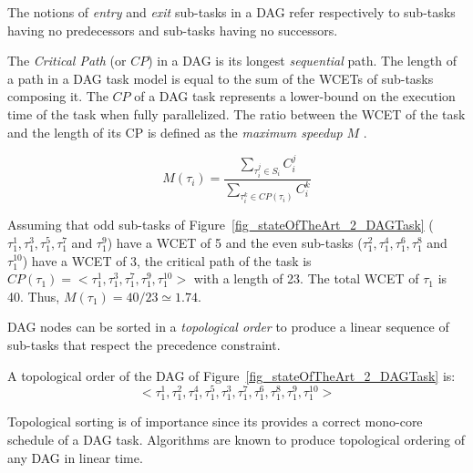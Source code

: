 \documentclass[main.tex]{subfiles}
\begin{document}
The notions of \emph{entry} and \emph{exit} sub-tasks in a DAG refer respectively to sub-tasks having no predecessors and sub-tasks having no successors.


The \emph{Critical Path} (or $CP$) in a DAG is its longest \emph{sequential} path. The length of a path in a DAG task model is equal to the sum of the WCETs of sub-tasks composing it. The $CP$ of a DAG task represents a lower-bound on the execution time of the task when fully parallelized. The ratio between the WCET of the task and the length of its CP is defined as the \emph{maximum speedup} $M$ \cite{Hill2008}.

\begin{displaymath}
    M(\tau_i) = \dfrac{ \underset{\tau_i^j \in S_i}{\sum} C_i^j}{ \underset{ \tau_i^k \in CP(\tau_i) }{\sum} C_i^k}
\end{displaymath}

\begin{example}
    Assuming that odd sub-tasks of Figure~\ref{fig_stateOfTheArt_2_DAGTask} 
    ($\tau_1^1 , \tau_1^3, \tau_1^5, \tau_1^7$ and $\tau_1^9$) have a WCET of 5 and the even sub-tasks 
    ($\tau_1^2 , \tau_1^4, \tau_1^6, \tau_1^8$ and $\tau_1^{10}$) have a WCET of 3, the critical path of the task is $CP(\tau_1) = <\tau_1^1 , \tau_1^3, \tau_1^7, \tau_1^9 , \tau_1^{10}>$ with a length of 23. The total WCET of $\tau_1$ is 40. Thus, $M(\tau_1) = 40/23 \simeq 1.74$. 
\end{example}

DAG nodes can be sorted in a \emph{topological order} to produce a linear sequence of sub-tasks that respect the precedence constraint.

\begin{example}
    A topological order of the DAG of Figure~\ref{fig_stateOfTheArt_2_DAGTask} is:
    $$< \tau_1^1 , \tau_1^2 , \tau_1^4 , \tau_1^5, \tau_1^3 , \tau_1^7 , \tau_1^6 , \tau_1^8 , \tau_1^9 , \tau_1^{10} >$$
\end{example}

Topological sorting is of importance since its provides a correct mono-core schedule of a DAG task. Algorithms are known to produce topological ordering of any DAG in linear time.\\
\end{document}

